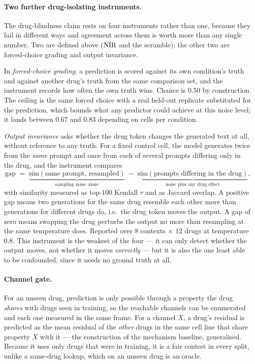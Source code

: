 \paragraph{Two further drug-isolating instruments.} The drug-blindness claim rests on four
instruments rather than one, because they fail in different ways and agreement across them is worth
more than any single number. Two are defined above ($\textrm{NIR}$ and the scramble); the other two are
forced-choice grading and output invariance.

In \emph{forced-choice grading}, a prediction is scored against its own condition's truth and
against another drug's truth from the same comparison set, and the instrument records how often the
own truth wins. Chance is $0.50$ by construction. The ceiling is the same forced choice with a real
held-out replicate substituted for the prediction, which bounds what any predictor could achieve at
this noise level; it lands between $0.67$ and $0.83$ depending on cells per condition.

\emph{Output invariance} asks whether the drug token changes the generated text at all, without
reference to any truth. For a fixed control cell, the model generates twice from the \emph{same}
prompt and once from each of several prompts differing only in the drug, and the instrument compares
\begin{equation}
  \textrm{gap} \;=\; \underbrace{\overline{\textrm{sim}}(\textrm{same prompt, resampled})}_{\textrm{sampling noise alone}}
  \;-\; \underbrace{\overline{\textrm{sim}}(\textrm{prompts differing in the drug})}_{\textrm{noise plus any drug effect}},
\end{equation}
with similarity measured as top-$100$ Kendall $\tau$ and as Jaccard overlap. A positive gap means two
generations for the same drug resemble each other more than generations for different drugs do,
i.e.\ the drug token moves the output. A gap of zero means swapping the drug perturbs the output no
more than resampling at the same temperature does. Reported over $8$ contexts $\times$ $12$ drugs at
temperature $0.8$. This instrument is the weakest of the four --- it can only detect whether the
output moves, not whether it moves \emph{correctly} --- but it is also the one least able to be
confounded, since it needs no ground truth at all.

\paragraph{Channel gate.} For an unseen drug, prediction is only possible through a property the drug
\emph{shares} with drugs seen in training, so the reachable channels can be enumerated and each one
measured in the same frame. For a channel $X$, a drug's residual is predicted as the mean residual of
the \emph{other} drugs in the same cell line that share property $X$ with it --- the construction of
the mechanism baseline, generalised. Because it uses only drugs that were in training, it is a fair
contest in every split, unlike a same-drug lookup, which on an unseen drug is an oracle.

